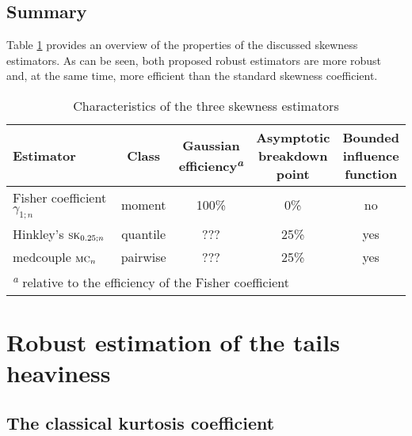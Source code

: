 
\subsection{Summary}

Table \ref{tab:stat:skewness} provides an overview of the
properties of the discussed skewness estimators. As can be seen, both proposed
robust estimators are more robust and, at the same time, more efficient than 
the standard skewness coefficient.                                              

\begin{table}[h!]
    \centering
    \caption{Characteristics of the three skewness estimators}
    \label{tab:stat:skewness}
    \begin{tabular}{lcccc}
        \toprule
        Estimator
        & Class  
        & \subtab{c}{Gaussian\\ efficiency\textsuperscript{\textit{a}}}
        & \subtab{c}{Asymptotic\\ breakdown\\ point} 
        & \subtab{c}{Bounded\\ influence\\ function}
        \\\midrule
        Fisher coefficient $\gamma_{1;n}$     & moment   & 100\%        &  0\% & no
        \\\addlinespace
        Hinkley's $\stsc{SK}_{0.25;n}$      & quantile & \alert{???} & 25\% & yes
        \\\addlinespace
        medcouple $\stsc{MC}_n$             & pairwise & \alert{???} & 25\% & yes
        \\\bottomrule
        \multicolumn{5}{l}{\footnotesize\textsuperscript{\textit{a}} relative to the 
        efficiency of the Fisher coefficient}
    \end{tabular}
\end{table}


\section{Robust estimation of the tails heaviness}
\label{subsec:kurtosis}

\subsection{The classical kurtosis coefficient}

